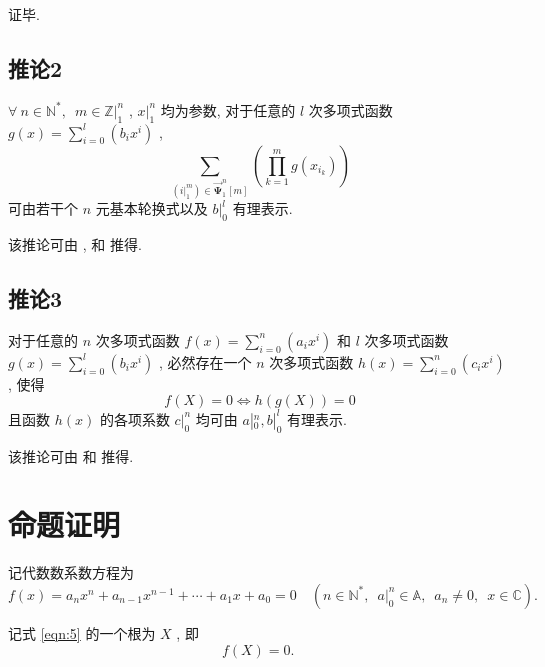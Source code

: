 \documentclass{article}
\renewcommand\.{.\hspace{3pt}}
\renewcommand\,{,\hspace{4pt}}
\renewcommand\:{:\hspace{3pt}}
\newcommand\A{,\hspace{6pt}}
\begin{document}
	证毕\.
	
	\subsection{推论2} \label{sec:3.6}
	$\forall \ n \in \mathbb{N^{\ast}} \A m \in \mathbb{Z} |_{1}^{n}$ \, $x |_{1}^{n}$ 均为参数\, 对于任意的 $l$ 次多项式函数 $g(x) = \sum_{i=0}^{l} \left( b_{i} x^{i} \right)$ \, $$\sum_{\left( i |_{1}^{m} \right) \in \bm{\vec{\Psi}}_{1}^{n} \left[ m \right]} \left( \prod_{k=1}^{m} g \left( x_{i_{k}} \right) \right)$$ 可由若干个 $n$ 元基本轮换式以及 $b |_{0}^{l}$ 有理表示\.
	
	该推论可由 \underline{} \, \underline{} 和 \underline{} 推得\.
	
	\subsection{推论3} \label{sec:3.7}
	对于任意的 $n$ 次多项式函数 $f(x) = \sum_{i=0}^{n} \left( a_{i} x^{i} \right)$ 和 $l$ 次多项式函数 $g(x) = \sum_{i=0}^{l} \left( b_{i} x^{i} \right)$ \, 必然存在一个 $n$ 次多项式函数 $h(x) = \sum_{i=0}^{n} \left( c_{i} x^{i} \right)$ \, 使得 $$f(X) = 0 \Leftrightarrow h \left( g(X) \right) = 0$$ 且函数 $h(x)$ 的各项系数 $c |_{0}^{n}$ 均可由 $a |_{0}^{n} , b |_{0}^{l}$ 有理表示\.
	
	该推论可由 \underline{} 和 \underline{} 推得\.
	
	\section{命题证明}
	记代数数系数方程为
	\begin{equation} \label{eqn:5}
		f(x) = a_{n} x^{n} + a_{n-1} x^{n-1} + \cdots + a_{1} x + a_{0} = 0 \quad \left( n \in \mathbb{N^{\ast}} \A a |_{0}^{n} \in \mathbb{A} \A a_{n} \neq 0 \A x \in \mathbb{C} \right) \.
	\end{equation}
	
	记式 \eqref{eqn:5} 的一个根为 $X$ \, 即
	\begin{equation} \label{eqn:6}
		f(X) = 0 \.
	\end{equation}
	
\end{document}
